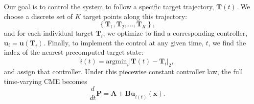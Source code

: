 \documentclass[12pt]{iopart}
\begin{document}
Our goal is to control the system to follow a specific target trajectory, $\mathbf{T}(t)$. We choose a discrete set of $K$ target points along this trajectory:
\begin{equation}
\left\{\mathbf{T}_1,\mathbf{T}_2,\ldots,\mathbf{T}_K\right\},
\end{equation}
and for each individual target $\mathbf{T}_i$, we optimize to find a corresponding controller, $\mathbf{u}_i=\mathbf{u}(\mathbf{T}_i)$. Finally, to implement the control at any given time, $t$, we find the index of the nearest precomputed target state:
\begin{equation}
\hat{i}(t) = \textrm{argmin}_i \left| \mathbf{T}(t) -  \mathbf{T}_i\right|_2,
\end{equation}
and assign that controller.
%
Under this piecewise constant controller law, the full time-varying CME becomes
\begin{equation}
\frac{d}{dt}\mathbf{P}=\mathbf{A}+\mathbf{B}\mathbf{u}_{\hat{i}(t)}(\mathbf{x}).
\end{equation}
\end{document}
